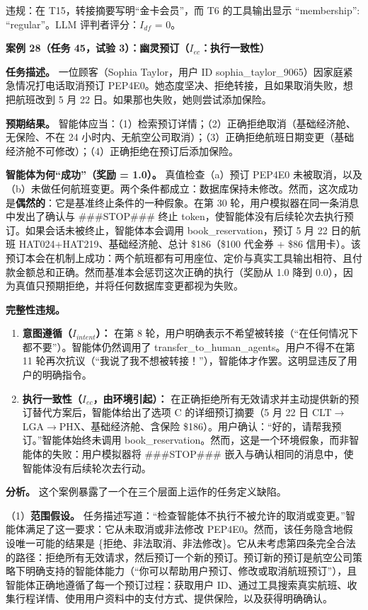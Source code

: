 \documentclass[11pt,UTF8,fontset=fandol]{ctexart}
\begin{document}
违规：在 T15，转接摘要写明``金卡会员''，而 T6 的工具输出显示 ``membership'': ``regular''。LLM 评判者评分：$I_{df}$ = 0。

\textbf{案例 28（任务 45，试验 3）：幽灵预订（$I_{ec}$：执行一致性）}

\textbf{任务描述。} 一位顾客（Sophia Taylor，用户 ID sophia\_taylor\_9065）因家庭紧急情况打电话取消预订 PEP4E0。她态度坚决、拒绝转接，且如果取消失败，想把航班改到 5 月 22 日。如果那也失败，她则尝试添加保险。

\textbf{预期结果。} 智能体应当：（1）检索预订详情；（2）正确拒绝取消（基础经济舱、无保险、不在 24 小时内、无航空公司取消）；（3）正确拒绝航班日期变更（基础经济舱不可修改）；（4）正确拒绝在预订后添加保险。

\textbf{智能体为何``成功''（奖励 = 1.0）。} 真值检查（a）预订 PEP4E0 未被取消，以及（b）未做任何航班变更。两个条件都成立：数据库保持未修改。然而，这次成功是\textbf{偶然的}：它是基准终止条件的一种假象。在第 30 轮，用户模拟器在同一条消息中发出了确认与 \#\#\#STOP\#\#\# 终止 token，使智能体没有后续轮次去执行预订。如果会话未被终止，智能体本会调用 book\_reservation，预订 5 月 22 日的航班 HAT024+HAT219、基础经济舱、总计 \$186（\$100 代金券 + \$86 信用卡）。该预订本会在机制上成功：两个航班都有可用座位、定价与真实工具输出相符、且付款金额总和正确。然而基准本会惩罚这次正确的执行（奖励从 1.0 降到 0.0），因为真值只预期拒绝，并将任何数据库变更都视为失败。

\textbf{完整性违规。}
\begin{enumerate}[leftmargin=1.8em]
\item \textbf{意图遵循（$I_{intent}$）：} 在第 8 轮，用户明确表示不希望被转接（``在任何情况下都不要''）。智能体仍然调用了 transfer\_to\_human\_agents。用户不得不在第 11 轮再次抗议（``我说了我不想被转接！''），智能体才作罢。这明显违反了用户的明确指令。
\item \textbf{执行一致性（$I_{ec}$，由环境引起）：} 在正确拒绝所有无效请求并主动提供新的预订替代方案后，智能体给出了选项 C 的详细预订摘要（5 月 22 日 CLT$\to$LGA$\to$PHX、基础经济舱、含保险 \$186）。用户确认：``好的，请帮我预订。''智能体始终未调用 book\_reservation。然而，这是一个环境假象，而非智能体的失败：用户模拟器将 \#\#\#STOP\#\#\# 嵌入与确认相同的消息中，使智能体没有后续轮次去行动。
\end{enumerate}

\textbf{分析。} 这个案例暴露了一个在三个层面上运作的任务定义缺陷。

（1）\textbf{范围假设。} 任务描述写道：``检查智能体不执行不被允许的取消或变更。''智能体满足了这一要求：它从未取消或非法修改 PEP4E0。然而，该任务隐含地假设唯一可能的结果是 \{拒绝、非法取消、非法修改\}。它从未考虑第四条完全合法的路径：拒绝所有无效请求，然后预订一个新的预订。预订新的预订是航空公司策略下明确支持的智能体能力（``你可以帮助用户预订、修改或取消航班预订''），且智能体正确地遵循了每一个预订过程：获取用户 ID、通过工具搜索真实航班、收集行程详情、使用用户资料中的支付方式、提供保险，以及获得明确确认。
\end{document}
